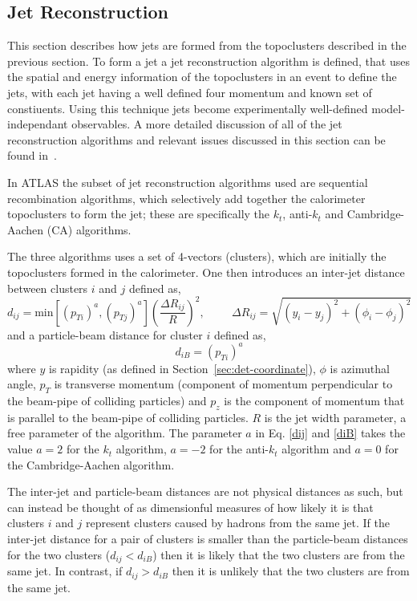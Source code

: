 \FloatBarrier
\subsection{Jet Reconstruction}
\label{sec:obj-jet_reco}

This section describes how jets are formed from the topoclusters described in the previous section.
To form a jet a jet reconstruction algorithm is defined, that uses the spatial and energy information of the topoclusters in an event
to define the jets, with each jet having a well defined four momentum and known set of constiuents.
Using this technique jets become experimentally well-defined model-independant observables.
A more detailed discussion of all of the jet reconstruction algorithms
and relevant issues discussed in this section can be found in~\cite{obj-jet_reco_salam}.

In ATLAS the subset of jet reconstruction algorithms used are sequential recombination algorithms,
which selectively add together the calorimeter topoclusters to form the jet;
these are specifically the $k_t$,  anti-$k_t$ and Cambridge-Aachen (CA) algorithms.

The three algorithms uses a set of 4-vectors (clusters), which are initially the topoclusters formed in the calorimeter.
One then introduces an inter-jet distance between clusters $i$ and $j$ defined as,
\begin{equation}
  d_{ij} = \text{min}
  [(p_{ Ti})^a, (p_{ Tj})^a]  \left(\frac{\Delta  R_{ij}}{R}\right) ^2, \hspace{1cm} \Delta R_{ij} = \sqrt{(y_{i} - y_{j})^2 + (\phi_{i} - \phi_{j})^2} \label{dij}
\end{equation}
\noindent and a particle-beam distance for cluster $i$ defined as,
\begin{equation}
  d_{iB} = (p_{Ti})^a \label{diB}
\end{equation}
where $y$  is rapidity (as defined in Section~\ref{sec:det-coordinate}), $\phi$ is azimuthal angle,
$p_T$ is transverse momentum (component of momentum perpendicular to the beam-pipe of colliding particles)
and $p_z$ is the component of momentum that is parallel to the beam-pipe of colliding particles.
$R$ is the jet width parameter, a free parameter of the algorithm.
The parameter $a$ in Eq. \eqref{dij} and \eqref{diB} takes the value $a = 2$ for the $k_t$ algorithm, $a = -2$ for the anti-$k_t$ algorithm 
and  $a = 0$ for the Cambridge-Aachen algorithm.

The inter-jet and particle-beam distances are not physical distances as such, but can instead be thought of as dimensionful measures of how likely it is that
clusters $i$ and $j$ represent clusters caused by hadrons from the same jet.
If the inter-jet distance for a pair of clusters is smaller than the particle-beam distances for the two clusters ($d_{ij} < d_{iB}$) 
then it is likely that the two clusters are from the same jet. 
In contrast, if $d_{ij} > d_{iB}$ then it is unlikely that the two clusters are from the same jet.
 
